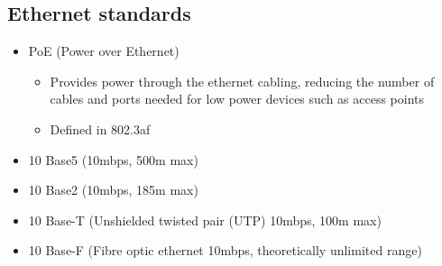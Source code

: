 \subsection*{Ethernet standards}

\begin{itemize}
  \item PoE (Power over Ethernet)
  \begin{itemize}
    \item Provides power through the ethernet cabling, reducing the number of cables and ports needed for low power devices such as access points
    \item Defined in 802.3af
  \end{itemize}
  \item 10 Base5 (10mbps, 500m max)
  \item 10 Base2 (10mbps, 185m max)
  \item 10 Base-T (Unshielded twisted pair (UTP) 10mbps, 100m max)
  \item 10 Base-F (Fibre optic ethernet 10mbps, theoretically unlimited range)
\end{itemize}